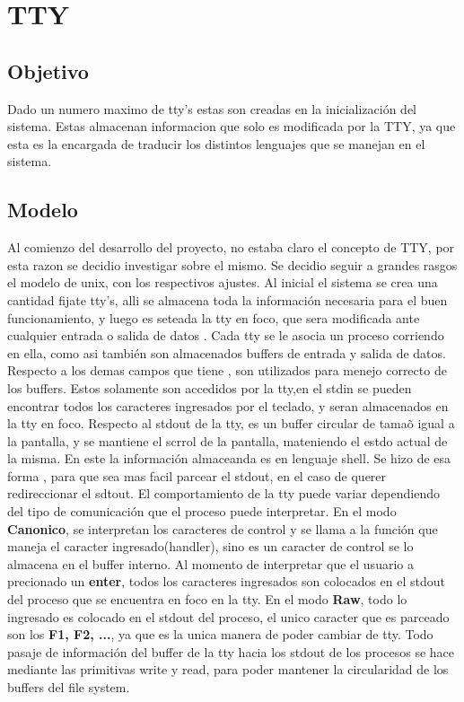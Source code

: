 \documentclass[10pt,a4paper]{article}
\begin{document}
\section{TTY}
	\subsection{Objetivo}
		Dado un numero maximo de tty's estas son creadas en la inicializaci\'on del  sistema. Estas almacenan informacion que solo es modificada por la TTY, ya que esta es la encargada de traducir los distintos lenguajes que se manejan en el sistema. 
	\subsection{Modelo}
		Al comienzo del desarrollo del proyecto, no estaba claro el concepto de TTY, por esta razon se decidio investigar sobre el mismo. Se decidio seguir a grandes rasgos el modelo de unix, con los respectivos ajustes. Al inicial el sistema se crea una cantidad fijate tty's, alli se almacena toda la informaci\'on necesaria para el buen funcionamiento, y luego es seteada la tty en foco, que sera modificada ante cualquier entrada o salida de datos . Cada tty se le asocia un proceso corriendo en ella, como asi tambi\'en son almacenados buffers de entrada y salida de datos. Respecto a los demas campos que tiene , son utilizados para menejo correcto de los buffers. Estos solamente son accedidos por la tty,en el stdin se pueden encontrar todos los caracteres ingresados por el teclado, y seran almacenados en la tty en foco. Respecto al stdout de la tty, es un buffer circular de tama\~o igual a la pantalla, y se mantiene el scrrol de la pantalla, mateniendo el estdo actual de la misma. En este la informaci\'on almaceanda es en lenguaje shell. Se hizo de esa forma , para que sea mas facil parcear el stdout, en el caso de querer redireccionar el sdtout.
		El comportamiento de la tty puede variar dependiendo del tipo de comunicaci\'on que el proceso puede interpretar. En el modo \textbf{Canonico}, se interpretan los caracteres de control y se llama a la funci\'on que maneja el caracter ingresado(handler), sino es un caracter de control se lo almacena en el buffer interno. Al momento de interpretar que el usuario a precionado un \textbf{enter}, todos los caracteres ingresados son colocados en el stdout del proceso que se encuentra en foco en la tty. 
		En el modo \textbf{Raw}, todo lo ingresado es colocado en el stdout del proceso, el unico caracter que es parceado son los \textbf{F1, F2, ...}, ya que es la unica manera de poder cambiar de tty. 
		Todo pasaje de informaci\'on del buffer de la tty hacia los stdout de los procesos se hace mediante las primitivas write y read, para poder mantener la circularidad de los buffers del file system.
\end{document}
